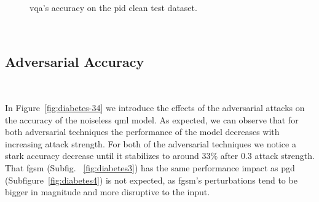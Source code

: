 \begin{figure}[!h]
  \caption{\ac{vqa}'s accuracy on the \ac{pid} clean test dataset.}
  \label{fig:diabetes-12}
\end{figure} \

\subsection{Adversarial Accuracy}\label{subsection:diabetes-adv-acc} \

In Figure~\ref{fig:diabetes-34} we introduce the effects of the
adversarial attacks on the accuracy of the noiseless \ac{qml}
model. As expected, we can observe that for both adversarial
techniques the performance of the model decreases with increasing
attack strength. For both of the adversarial techniques
we notice a stark accuracy decrease until it stabilizes to around
\(33\%\) after \(0.3\) attack strength. That \ac{fgsm} (Subfig.
~\ref{fig:diabetes3}) has the same performance impact as \ac{pgd}
(Subfigure~\ref{fig:diabetes4}) is not expected, as \ac{fgsm}'s
perturbations tend to be bigger in magnitude and more disruptive
to the input. \

